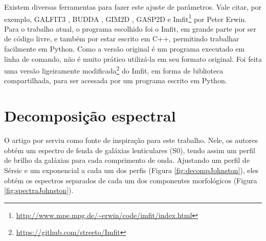 Existem diversas ferramentas para fazer este ajuste de parâmetros. Vale citar,
por exemplo, GALFIT3 \citep{Peng2010}, BUDDA \citep{DeSouza2004}, GIM2D
\citep{Simard2002}, GASP2D \citep{MendezAbreu2008} e
Imfit\footnote{\url{http://www.mpe.mpg.de/~erwin/code/imfit/index.html}} por
Peter Erwin. Para o trabalho atual, o programa escolhido foi o Imfit, em grande
parte por ser de código livre, e também por estar escrito em C++, permitindo
trabalhar facilmente em Python. Como a versão original é um programa executado
em linha de comando, não é muito prático utilizá-la em seu formato original. Foi
feita uma versão ligeiramente
modificada\footnote{\url{https://github.com/streeto/Imfit}} do Imfit, em forma
de biblioteca compartilhada, para ser acessada por um programa escrito em
Python.



\section{Decomposição espectral}

O artigo por \citet{Johnston2012} serviu como fonte de inspiração para este
trabalho. Nele, os autores obtém um espectro de fenda de galáxias lenticulares
(S0), tendo assim um perfil de brilho da galáxias para cada comprimento de onda.
Ajustando um perfil de Sérsic e um exponencial a cada um dos perfis (Figura
\ref{fig:decompJohnston}), eles obtém os espectros separados de cada um dos
componentes morfológicos (Figura \ref{fig:spectraJohnston}). 

